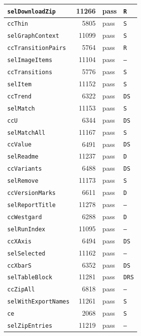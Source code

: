 {\begin{xltabular}{\linewidth}{|l|r|X|X|}
\texttt{selDownloadZip} & 11266 & pass & \texttt{R} \\ \hline
\texttt{ccThin} & 5805 & pass & \texttt{S} \\ \hline
\texttt{selGraphContext} & 11099 & pass & \texttt{S} \\ \hline
\texttt{ccTransitionPairs} & 5764 & pass & \texttt{R} \\ \hline
\texttt{selImageItems} & 11104 & pass & \texttt{--} \\ \hline
\texttt{ccTransitions} & 5776 & pass & \texttt{S} \\ \hline
\texttt{selItem} & 11152 & pass & \texttt{S} \\ \hline
\texttt{ccTrend} & 6322 & pass & \texttt{DS} \\ \hline
\texttt{selMatch} & 11153 & pass & \texttt{S} \\ \hline
\texttt{ccU} & 6344 & pass & \texttt{DS} \\ \hline
\texttt{selMatchAll} & 11167 & pass & \texttt{S} \\ \hline
\texttt{ccValue} & 6491 & pass & \texttt{DS} \\ \hline
\texttt{selReadme} & 11237 & pass & \texttt{D} \\ \hline
\texttt{ccVariants} & 6488 & pass & \texttt{DS} \\ \hline
\texttt{selRemove} & 11173 & pass & \texttt{S} \\ \hline
\texttt{ccVersionMarks} & 6611 & pass & \texttt{D} \\ \hline
\texttt{selReportTitle} & 11278 & pass & \texttt{--} \\ \hline
\texttt{ccWestgard} & 6288 & pass & \texttt{D} \\ \hline
\texttt{selRunIndex} & 11095 & pass & \texttt{--} \\ \hline
\texttt{ccXAxis} & 6494 & pass & \texttt{DS} \\ \hline
\texttt{selSelected} & 11162 & pass & \texttt{--} \\ \hline
\texttt{ccXbarS} & 6352 & pass & \texttt{DS} \\ \hline
\texttt{selTableBlock} & 11281 & pass & \texttt{DRS} \\ \hline
\texttt{ccZipAll} & 6818 & pass & \texttt{--} \\ \hline
\texttt{selWithExportNames} & 11261 & pass & \texttt{S} \\ \hline
\texttt{ce} & 2068 & pass & \texttt{S} \\ \hline
\texttt{selZipEntries} & 11219 & pass & \texttt{--} \\ \hline

\end{xltabular}}
